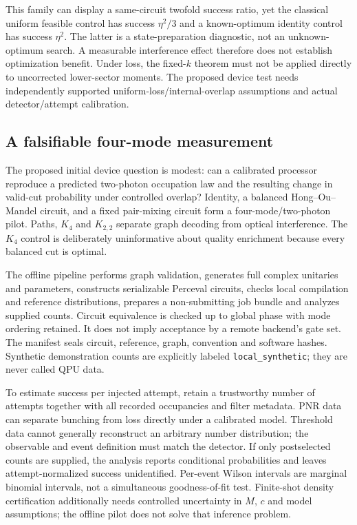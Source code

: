 \documentclass[11pt,a4paper]{article}
\theoremstyle{remark}\newtheorem{remark}[theorem]{Remark}
\begin{document}
This family can display a same-circuit twofold success ratio, yet the classical uniform feasible control has success $\eta^2/3$ and a known-optimum identity control has success $\eta^2$. The latter is a state-preparation diagnostic, not an unknown-optimum search. A measurable interference effect therefore does not establish optimization benefit. Under loss, the fixed-$k$ theorem must not be applied directly to uncorrected lower-sector moments. The proposed device test needs independently supported uniform-loss/internal-overlap assumptions and actual detector/attempt calibration.

\subsection{A falsifiable four-mode measurement}
The proposed initial device question is modest: can a calibrated processor reproduce a predicted two-photon occupation law and the resulting change in valid-cut probability under controlled overlap? Identity, a balanced Hong--Ou--Mandel circuit, and a fixed pair-mixing circuit form a four-mode/two-photon pilot. Paths, $K_4$ and $K_{2,2}$ separate graph decoding from optical interference. The $K_4$ control is deliberately uninformative about quality enrichment because every balanced cut is optimal.

The offline pipeline performs graph validation, generates full complex unitaries and parameters, constructs serializable Perceval circuits, checks local compilation and reference distributions, prepares a non-submitting job bundle and analyzes supplied counts. Circuit equivalence is checked up to global phase with mode ordering retained. It does not imply acceptance by a remote backend's gate set. The manifest seals circuit, reference, graph, convention and software hashes. Synthetic demonstration counts are explicitly labeled \texttt{local\_synthetic}; they are never called QPU data.

To estimate success per injected attempt, retain a trustworthy number of attempts together with all recorded occupancies and filter metadata. PNR data can separate bunching from loss directly under a calibrated model. Threshold data cannot generally reconstruct an arbitrary number distribution; the observable and event definition must match the detector. If only postselected counts are supplied, the analysis reports conditional probabilities and leaves attempt-normalized success unidentified. Per-event Wilson intervals are marginal binomial intervals, not a simultaneous goodness-of-fit test. Finite-shot density certification additionally needs controlled uncertainty in $M$, $c$ and model assumptions; the offline pilot does not solve that inference problem.
\end{document}
